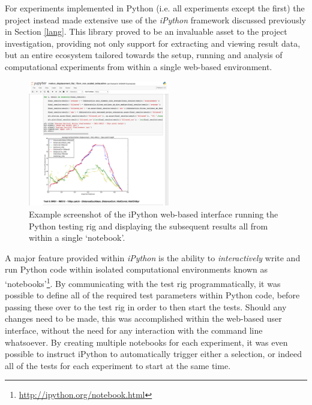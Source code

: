 For experiments implemented in Python (i.e. all experiments except the first) the project instead made extensive use of the \textit{iPython} framework \cite{ipython} discussed previously in Section \ref{lang}. This library proved to be an invaluable asset to the project investigation, providing not only support for extracting and viewing result data, but an entire ecosystem tailored towards the setup, running and analysis of computational experiments from within a single web-based environment. 

\begin{figure}
\vspace{-20pt}
  \begin{center}
    \includegraphics[width=0.55\textwidth]{images/ipython.png}
  \end{center}
  \vspace{-10pt}
  \caption{Example screenshot of the iPython web-based interface running the Python testing rig and displaying the subsequent results all from within a single `notebook'.}
     \label{fig:ipython}
\end{figure}

A major feature provided within \textit{iPython} is the ability to \textit{interactively} write and run Python code within isolated computational environments known as `notebooks'\footnote{\url{http://ipython.org/notebook.html}}. By communicating with the test rig programmatically, it was possible to define all of the required test parameters within Python code, before passing these over to the test rig in order to then start the tests. Should any changes need to be made, this was accomplished within the web-based user interface, without the need for any interaction with the command line whatsoever. By creating multiple notebooks for each experiment, it was even possible to instruct iPython to automatically trigger either a selection, or indeed all of the tests for each experiment to start at the same time. 


